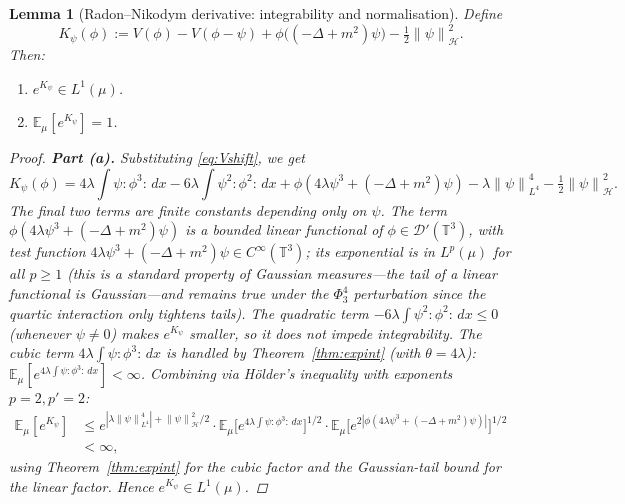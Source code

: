 \documentclass[11pt,a4paper]{article}
\newtheorem{lemma}[theorem]{Lemma}
\theoremstyle{definition}
\newcommand{\T}{\mathbb{T}}
\newcommand{\E}{\mathbb{E}}
\newcommand{\Dc}{\mathcal{D}}
\newcommand{\Hc}{\mathcal{H}}
\newcommand{\norm}[1]{\left\|#1\right\|}
\newcommand{\wick}[1]{:\!#1\!:}
\begin{document}
\begin{lemma}[Radon--Nikodym derivative: integrability and normalisation]\label{lem:RN}
Define
\begin{equation}\label{eq:Kpsi}
K_\psi(\phi)
:= V(\phi) - V(\phi-\psi) + \phi\!\bigl((-\Delta+m^2)\psi\bigr) - \tfrac{1}{2}\norm{\psi}_\Hc^2.
\end{equation}
Then:
\begin{enumerate}
\item[\textnormal{(a)}] $e^{K_\psi}\in L^1(\mu)$.
\item[\textnormal{(b)}] $\E_\mu[e^{K_\psi}] = 1$.
\end{enumerate}

\begin{proof}
\textbf{Part (a).}
Substituting \eqref{eq:Vshift}, we get
\begin{equation}\label{eq:Kpsi_expand}
K_\psi(\phi) = 4\lambda\!\int\!\psi\wick{\phi^3}\,dx
  - 6\lambda\!\int\!\psi^2\wick{\phi^2}\,dx
  + \phi(4\lambda\psi^3 + (-\Delta+m^2)\psi)
  - \lambda\norm{\psi}_{L^4}^4
  - \tfrac{1}{2}\norm{\psi}_\Hc^2.
\end{equation}
The final two terms are finite constants depending only on $\psi$.
The term $\phi(4\lambda\psi^3 + (-\Delta+m^2)\psi)$ is a bounded linear functional of $\phi\in\Dc'(\T^3)$, with test function $4\lambda\psi^3+(-\Delta+m^2)\psi\in C^\infty(\T^3)$; its exponential is in $L^p(\mu)$ for all $p\ge 1$ (this is a standard property of Gaussian measures---the tail of a linear functional is Gaussian---and remains true under the $\Phi^4_3$ perturbation since the quartic interaction only tightens tails).
The quadratic term $-6\lambda\int\psi^2\wick{\phi^2}\,dx\le 0$ (whenever $\psi\ne 0$) makes $e^{K_\psi}$ smaller, so it does not impede integrability.
The cubic term $4\lambda\int\psi\wick{\phi^3}\,dx$ is handled by Theorem~\ref{thm:expint} (with $\theta = 4\lambda$): $\E_\mu[e^{4\lambda\int\psi\wick{\phi^3}\,dx}]<\infty$.
Combining via Hölder's inequality with exponents $p=2, p'=2$:
\begin{align*}
\E_\mu[e^{K_\psi}]
&\le e^{|\lambda\norm{\psi}_{L^4}^4|+\norm{\psi}_\Hc^2/2}
\cdot\E_\mu\!\bigl[e^{4\lambda\int\psi\wick{\phi^3}\,dx}\bigr]^{1/2}
\cdot\E_\mu\!\bigl[e^{2|\phi(4\lambda\psi^3+(-\Delta+m^2)\psi)|}\bigr]^{1/2}\\
&<\infty,
\end{align*}
using Theorem~\ref{thm:expint} for the cubic factor and the Gaussian-tail bound for the linear factor.
Hence $e^{K_\psi}\in L^1(\mu)$.


\end{proof}
\end{lemma}
\end{document}
